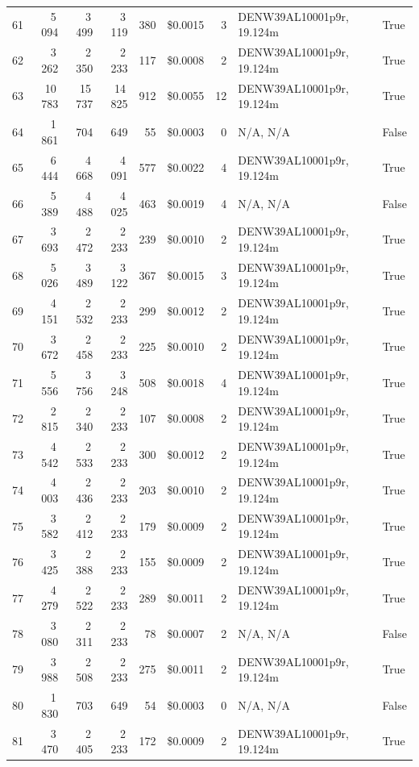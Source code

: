 \documentclass[a4paper,11pt]{article}
\begin{document}
\begin{table}[ht]
\begin{tabular}{r r r r r r r p{3cm} l}
61 & 5\,094 & 3\,499 & 3\,119 & 380 & \$0.0015 & 3 & DENW39AL10001p9r, 19.124m & True \\
62 & 3\,262 & 2\,350 & 2\,233 & 117 & \$0.0008 & 2 & DENW39AL10001p9r, 19.124m & True \\
63 & 10\,783 & 15\,737 & 14\,825 & 912 & \$0.0055 & 12 & DENW39AL10001p9r, 19.124m & True \\
64 & 1\,861 & 704 & 649 & 55 & \$0.0003 & 0 & N/A, N/A & False \\
65 & 6\,444 & 4\,668 & 4\,091 & 577 & \$0.0022 & 4 & DENW39AL10001p9r, 19.124m & True \\
66 & 5\,389 & 4\,488 & 4\,025 & 463 & \$0.0019 & 4 & N/A, N/A & False \\
67 & 3\,693 & 2\,472 & 2\,233 & 239 & \$0.0010 & 2 & DENW39AL10001p9r, 19.124m & True \\
68 & 5\,026 & 3\,489 & 3\,122 & 367 & \$0.0015 & 3 & DENW39AL10001p9r, 19.124m & True \\
69 & 4\,151 & 2\,532 & 2\,233 & 299 & \$0.0012 & 2 & DENW39AL10001p9r, 19.124m & True \\
70 & 3\,672 & 2\,458 & 2\,233 & 225 & \$0.0010 & 2 & DENW39AL10001p9r, 19.124m & True \\
71 & 5\,556 & 3\,756 & 3\,248 & 508 & \$0.0018 & 4 & DENW39AL10001p9r, 19.124m & True \\
72 & 2\,815 & 2\,340 & 2\,233 & 107 & \$0.0008 & 2 & DENW39AL10001p9r, 19.124m & True \\
73 & 4\,542 & 2\,533 & 2\,233 & 300 & \$0.0012 & 2 & DENW39AL10001p9r, 19.124m & True \\
74 & 4\,003 & 2\,436 & 2\,233 & 203 & \$0.0010 & 2 & DENW39AL10001p9r, 19.124m & True \\
75 & 3\,582 & 2\,412 & 2\,233 & 179 & \$0.0009 & 2 & DENW39AL10001p9r, 19.124m & True \\
76 & 3\,425 & 2\,388 & 2\,233 & 155 & \$0.0009 & 2 & DENW39AL10001p9r, 19.124m & True \\
77 & 4\,279 & 2\,522 & 2\,233 & 289 & \$0.0011 & 2 & DENW39AL10001p9r, 19.124m & True \\
78 & 3\,080 & 2\,311 & 2\,233 & 78 & \$0.0007 & 2 & N/A, N/A & False \\
79 & 3\,988 & 2\,508 & 2\,233 & 275 & \$0.0011 & 2 & DENW39AL10001p9r, 19.124m & True \\
80 & 1\,830 & 703 & 649 & 54 & \$0.0003 & 0 & N/A, N/A & False \\
81 & 3\,470 & 2\,405 & 2\,233 & 172 & \$0.0009 & 2 & DENW39AL10001p9r, 19.124m & True \\

\end{tabular}
\end{table}
\end{document}
